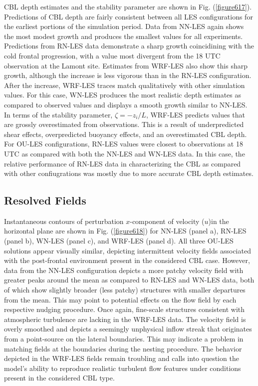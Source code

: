 CBL depth estimates and the stability parameter are shown in Fig. (\autoref{figure617}). Predictions of CBL depth are fairly consistent between all LES configurations for the earliest portions of the simulation period. Data from NN-LES again shows the most modest growth and produces the smallest values for all experiments. Predictions from RN-LES data demonstrate a sharp growth coincidining with the cold frontal progression, with a value most divergent from the 18 UTC observation at the Lamont site. Estimates from WRF-LES also show this sharp growth, although the increase is less vigorous than in the RN-LES configuration. After the increase, WRF-LES traces match qualitatively with other simulation values. For this case, WN-LES produces the most realistic depth estimates as compared to observed values and displays a smooth growth similar to NN-LES. In terms of the stability parameter, $\zeta = -z_i / L$, WRF-LES predicts values that are grossly overestimated from observations. This is a result of underpredicted shear effects, overpredicted buoyancy effects, and an overestimated CBL depth. For OU-LES configurations, RN-LES values were closest to observations at 18 UTC as compared with both the NN-LES and WN-LES data. In this case, the relative performance of RN-LES data in characterizing the CBL as compared with other confiugrations was mostly due to more accurate CBL depth estimates. 

\subsection{Resolved Fields}
\label{resolve-632}

Instantaneous contours of perturbation $x$-component of velocity ($u$)in the horizontal plane are shown in Fig. (\autoref{figure618}) for NN-LES (panel a), RN-LES (panel b), WN-LES (panel c), and WRF-LES (panel d). All three OU-LES solutions appear visually similar, depicting intermittent velocity fields associated with the post-frontal environment present in the considered CBL case. However, data from the NN-LES configuration depicts a more patchy velocity field with greater peaks around the mean as compared to RN-LES and WN-LES data, both of which show slightly broader (less patchy) structures with smaller departures from the mean. This may point to potential effects on the flow field by each respective nudging procedure. Once again, fine-scale structures consistent with atmospheric turbulence are lacking in the WRF-LES data. The velocity field is overly smoothed and depicts a seemingly unphysical inflow streak that originates from a point-source on the lateral boundaries. This may indicate a problem in matching fields at the boundaries during the nesting procedure. The behavior depicted in the WRF-LES fields remain troubling and calls into question the model's ability to reproduce realistic turbulent flow features under conditions present in the considered CBL type.


